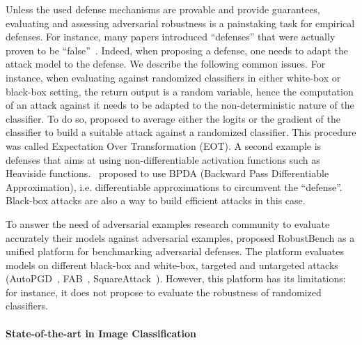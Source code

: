 Unless the used defense mechanisms are provable and provide guarantees, evaluating and assessing adversarial robustness is a painstaking task for empirical defenses. For instance, many papers introduced ``defenses'' that were actually proven to be ``false''~\citep{athalye2018obfuscated,carlini2019evaluating}. Indeed, when proposing a defense, one needs to adapt the attack model to the defense. We describe the following common issues. For instance, when evaluating against randomized classifiers in either white-box or black-box setting, the return output is a random variable, hence the computation of an attack against it needs to be adapted to the non-deterministic nature of the classifier. To do so, \cite{athalye2018obfuscated} proposed to average either the logits or the gradient of the classifier to build a suitable attack against a randomized classifier. This procedure was called Expectation Over Transformation (EOT). A second example is defenses that aims at using non-differentiable activation functions such as Heaviside functions.~\cite{athalye2017synthesizing} proposed to use BPDA (Backward Pass Differentiable Approximation), i.e. differentiable approximations to circumvent the ``defense''. Black-box attacks are also a way to build efficient attacks in this case. 

To answer the need of adversarial examples research community to evaluate accurately their models against adversarial examples, \cite{croce2020robustbench} proposed RobustBench as a unified platform for benchmarking adversarial defenses. The platform evaluates models on different black-box and white-box, targeted and untargeted attacks (AutoPGD~\citep{croce2020reliable}, FAB~\citep{Croce2020MinimallyDA}, SquareAttack~\citep{andriushchenko2019square}). However, this platform has its limitations:  for instance, it  does not propose to evaluate the robustness of randomized classifiers. 

\paragraph{State-of-the-art in Image Classification}

